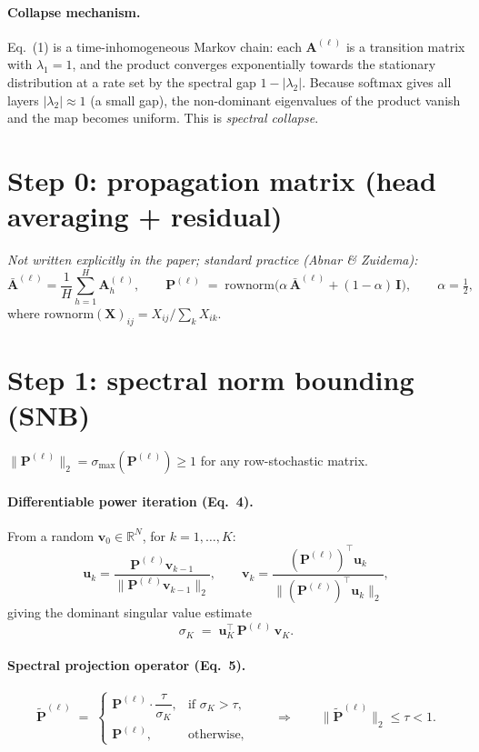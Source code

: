 \documentclass[11pt]{article}
\newcommand{\A}{\mathbf{A}}
\newcommand{\I}{\mathbf{I}}
\newcommand{\Pm}{\mathbf{P}}
\newcommand{\Pt}{\tilde{\mathbf{P}}}
\newcommand{\uu}{\mathbf{u}}
\newcommand{\vv}{\mathbf{v}}
\newcommand{\Rb}{\mathbb{R}}
\begin{document}
\paragraph{Collapse mechanism.} Eq.~(1) is a time-inhomogeneous Markov chain: each
$\A^{(\ell)}$ is a transition matrix with $\lambda_1=1$, and the product converges
exponentially towards the stationary distribution at a rate set by the spectral gap
$1-|\lambda_2|$. Because softmax gives all layers $|\lambda_2|\approx 1$
(a small gap), the non-dominant eigenvalues of the product vanish and the map
becomes uniform. This is \emph{spectral collapse}.

\section{Step 0: propagation matrix (head averaging + residual)}

\emph{Not written explicitly in the paper; standard practice (Abnar \& Zuidema):}
\begin{equation}
\bar{\A}^{(\ell)} = \frac{1}{H}\sum_{h=1}^{H}\A^{(\ell)}_h,
\qquad
\Pm^{(\ell)} \;=\; \mathrm{rownorm}\!\Big(\alpha\,\bar{\A}^{(\ell)} + (1-\alpha)\,\I\Big),
\qquad \alpha = \tfrac{1}{2},
\end{equation}
where $\mathrm{rownorm}(\mathbf{X})_{ij} = X_{ij}/\sum_k X_{ik}$.

\section{Step 1: spectral norm bounding (SNB)}

$\|\Pm^{(\ell)}\|_2 = \sigma_{\max}(\Pm^{(\ell)}) \ge 1$ for any row-stochastic matrix.

\paragraph{Differentiable power iteration (Eq.~4).} From a random
$\vv_0\in\Rb^{N}$, for $k=1,\dots,K$:
\begin{equation}
\uu_k = \frac{\Pm^{(\ell)}\vv_{k-1}}{\|\Pm^{(\ell)}\vv_{k-1}\|_2},
\qquad
\vv_k = \frac{(\Pm^{(\ell)})^{\!\top}\uu_k}{\|(\Pm^{(\ell)})^{\!\top}\uu_k\|_2},
\end{equation}
giving the dominant singular value estimate
\begin{equation}
\sigma_K \;=\; \uu_K^{\top}\,\Pm^{(\ell)}\,\vv_K .
\end{equation}

\paragraph{Spectral projection operator (Eq.~5).}
\begin{equation}
\Pt^{(\ell)} \;=\;
\begin{cases}
\Pm^{(\ell)} \cdot \dfrac{\tau}{\sigma_K}, & \text{if } \sigma_K > \tau,\\[8pt]
\Pm^{(\ell)}, & \text{otherwise,}
\end{cases}
\qquad\Longrightarrow\qquad
\big\|\Pt^{(\ell)}\big\|_2 \le \tau < 1 .
\end{equation}
\end{document}
